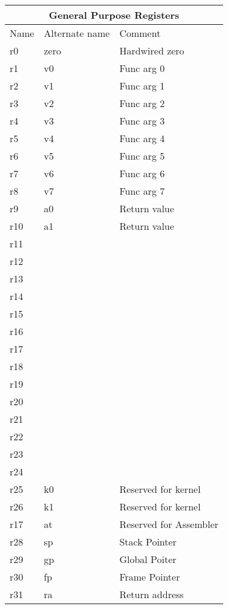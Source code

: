 \begin{tabular}{ |p{3cm}|p{3cm}|p{4cm}|  }
    \hline
    \multicolumn{3}{|c|}{General Purpose Registers} \\
    \hline
    Name& Alternate name & Comment \\
    \hline
    r0  & zero & Hardwired zero\\
    r1  & v0   & Func arg 0 \\
    r2  & v1   & Func arg 1 \\
    r3  & v2   & Func arg 2 \\
    r4  & v3   & Func arg 3 \\
    r5  & v4   & Func arg 4 \\
    r6  & v5   & Func arg 5 \\
    r7  & v6   & Func arg 6 \\
    r8  & v7   & Func arg 7 \\
    r9  & a0   & Return value \\
    r10 & a1   & Return value \\
    r11 &      &  \\
    r12 &      &  \\
    r13 &      &  \\
    r14 &      &  \\
    r15 &      &  \\
    r16 &      &  \\
    r17 &      &  \\
    r18 &      &  \\
    r19 &      &  \\
    r20 &      &  \\
    r21 &      &  \\
    r22 &      &  \\
    r23 &      &  \\
    r24 &      &  \\
    r25 & k0   &  Reserved for kernel \\
    r26 & k1   &  Reserved for kernel \\
    r17 & at   &  Reserved for Assembler \\
    r28 & sp   &  Stack Pointer \\
    r29 & gp   &  Global Poiter \\
    r30 & fp   &  Frame Pointer \\
    r31 & ra   &  Return address \\
    
    \hline
\end{tabular}

